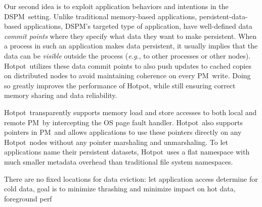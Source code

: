 \documentclass[sigconf]{acmart}
\renewcommand{\em}{\it}
\newcommand{\eg}{\textit{e.g.}}
\newcommand{\dsnvm}{DSPM}
\newcommand{\nvm}{PM}
\newcommand{\hotpot}{Hotpot}
\providecommand{\DIFdelend}{} %
\begin{document}
\DIFdelend Our second idea is to exploit application behaviors and intentions in the \dsnvm\ setting. 
Unlike traditional memory-based applications, persistent-data-based applications,
\dsnvm's targeted type of application, have well-defined data {\em commit points}
where they specify what data they want to make persistent.
When a process in such an application makes data persistent,
it usually implies that the data can be {\em visible} outside the process (\eg, to other processes or other nodes). 
\hotpot\ utilizes these data commit points to also push updates to cached copies on distributed nodes
to avoid maintaining coherence on every \nvm\ write. %
Doing so greatly improves the performance of \hotpot, 
while still ensuring correct memory sharing and data reliability.



\hotpot\ transparently supports memory load and store accesses to both local and remote \nvm\ 
by intercepting the OS page fault handler.
\hotpot\ also supports pointers in \nvm\ and allows applications to use these pointers directly on any \hotpot\ nodes
without any pointer marshaling and unmarshaling.
To let applications name their persistent datasets, \hotpot\ uses a flat namespace with much smaller 
metadata overhead than traditional file system namespaces.

There are no fixed locations for data
eviction: let application access determine
for cold data, goal is to minimize thrashing and minimize impact on hot data, foreground perf
\fi
\end{document}
